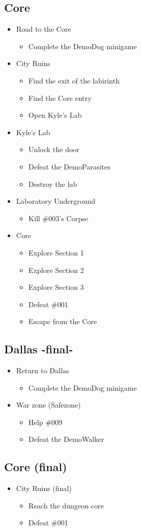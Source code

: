 \subsection{Core}
\begin{itemize}
	\item Road to the Core
	\begin{itemize}	
		\item Complete the DemoDog minigame
	\end{itemize}
	\item City Ruins
	\begin{itemize}
		\item Find the exit of the labirinth
		\item Find the Core entry 
		\item Open Kyle's Lab
	\end{itemize}
	\item Kyle's Lab
	\begin{itemize}
		\item Unlock the door
		\item Defeat the DemoParasites
		\item Destroy the lab
	\end{itemize}
	\item Laboratory Underground
	\begin{itemize}
		\item Kill \#003's Corpse
	\end{itemize}
	\item Core
	\begin{itemize}
		\item Explore Section 1
		\item Explore Section 2
		\item Explore Section 3
		\item Defeat \#001
		\item Escape from the Core
	\end{itemize}
\end{itemize}

\subsection{Dallas -final-}
\begin{itemize}
	\item Return to Dallas
	\begin{itemize}	
		\item Complete the DemoDog minigame
	\end{itemize}
	\item War zone (Safezone)
	\begin{itemize}
		\item Help \#009
		\item Defeat the DemoWalker
	\end{itemize}
\end{itemize}

\subsection{Core (final)}
\begin{itemize}
	\item City Ruins (final)
	\begin{itemize}
		\item Reach the dungeon core
		\item Defeat \#001 
	\end{itemize}
\end{itemize}


